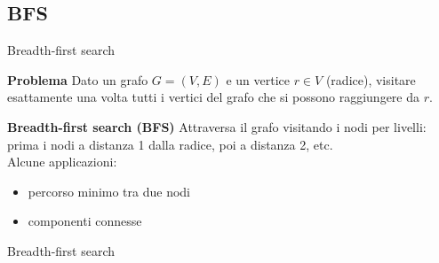 \documentclass[compress]{beamer}
\begin{document}
\subsection{BFS}
\begin{frame}{Breadth-first search}
  \begin{block}{\textbf{Problema}}
    Dato un grafo $G = (V, E)$ e un vertice $r \in V$ (radice), visitare esattamente una
     volta tutti i vertici del grafo che si possono raggiungere da $r$.
  \end{block}
  \begin{block}{\textbf{Breadth-first search (BFS)}}
    Attraversa il grafo visitando i nodi per livelli: prima i nodi a distanza 1 dalla radice, poi a distanza 2, etc.\\
    Alcune applicazioni:

    \begin{itemize}
    \item percorso minimo tra due nodi
    \item componenti connesse
    \end{itemize}
  \end{block}
\end{frame}

\begin{frame}[fragile]{Breadth-first search}
\end{frame}
\end{document}
